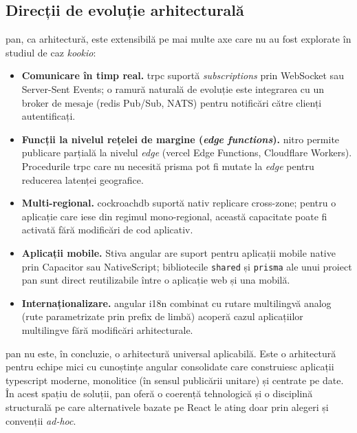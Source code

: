 \subsection{Direcții de evoluție arhitecturală}\label{subsec:pan-evolutie}

\gls{pan}, ca arhitectură, este extensibilă pe mai multe axe care nu au fost explorate în studiul de caz \textit{\gls{kookio}}:

\begin{itemize}
  \item \textbf{Comunicare în timp real.} \gls{trpc} suportă \textit{subscriptions} prin WebSocket sau Server-Sent Events; o ramură naturală de evoluție este integrarea cu un broker de mesaje (\gls{redis} Pub/Sub, NATS) pentru notificări către clienți autentificați.

  \item \textbf{Funcții la nivelul rețelei de margine (\textit{edge functions}).} \gls{nitro} permite publicare parțială la nivelul \textit{edge} (\gls{vercel} Edge Functions, Cloudflare Workers). Procedurile \gls{trpc} care nu necesită \gls{prisma} pot fi mutate la \textit{edge} pentru reducerea latenței geografice.

  \item \textbf{Multi-regional.} \gls{cockroachdb} suportă nativ replicare cross-zone; pentru o aplicație care iese din regimul mono-regional, această capacitate poate fi activată fără modificări de cod aplicativ.

  \item \textbf{Aplicații mobile.} Stiva \gls{angular} are suport pentru aplicații mobile native prin Capacitor sau NativeScript; bibliotecile \texttt{shared} și \texttt{prisma} ale unui proiect \gls{pan} sunt direct reutilizabile între o aplicație \gls{web} și una mobilă.

  \item \textbf{Internaționalizare.} \gls{angular} i18n combinat cu rutare multilingvă \gls{analog} (rute parametrizate prin prefix de limbă) acoperă cazul aplicațiilor multilingve fără modificări arhitecturale.
\end{itemize}

\gls{pan} nu este, în concluzie, o arhitectură universal aplicabilă.
Este o arhitectură pentru echipe mici cu cunoștințe \gls{angular} consolidate care construiesc aplicații \gls{typescript} moderne, monolitice (în sensul publicării unitare) și centrate pe date.
În acest spațiu de soluții, \gls{pan} oferă o coerență tehnologică și o disciplină structurală pe care alternativele bazate pe React le ating doar prin alegeri și convenții \textit{ad-hoc}.
